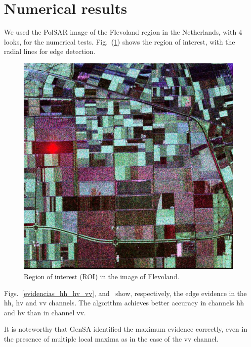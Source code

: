 \documentclass[conference]{IEEEtran}
\begin{document}
\section{Numerical results}\label{sec_08}

We used the PolSAR image of the Flevoland region in the Netherlands, with $4$ looks, for the numerical tests. 
Fig.~(\ref{flevoland_radial_4look}) shows the region of interest, with the radial lines for edge detection.

\begin{figure}[hbt]
\centering
	\includegraphics[width=\linewidth]{flevoland_radial_4_look}
	\caption{Region of interest (ROI) in the image of Flevoland.}
\label{flevoland_radial_4look}
\end{figure}

Figs.~\ref{evidencias_hh_hv_vv},  and~ show, respectively, the edge evidence in the $\text{hh}$, $\text{hv}$ and $\text{vv}$ channels. 
The algorithm achieves better accuracy in channels $\text{hh}$ and $\text{hv}$ than in channel $\text{vv}$.  

It is noteworthy that GenSA identified the maximum evidence correctly, even in the presence of multiple local maxima as in the case of the $\text{vv}$ channel.
\end{document}

